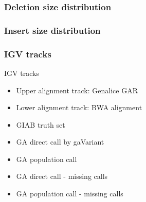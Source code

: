 \documentclass{beamer}
\begin{document}
\begin{frame}
\frametitle{Deletion size distribution}
\end{frame}

\begin{frame}
\frametitle{Insert size distribution}
\end{frame}

\begin{frame}
\frametitle{IGV tracks}
	\begin{block}{IGV tracks}
		\begin{itemize}
			\item Upper alignment track: Genalice GAR
			\item Lower alignment track: BWA alignment
			\item GIAB truth set
			\item GA direct call by gaVariant
			\item GA population call 
			\item GA direct call - missing calls
			\item GA population call - missing calls
		\end{itemize}
	\end{block}
\end{frame}
\end{document}
